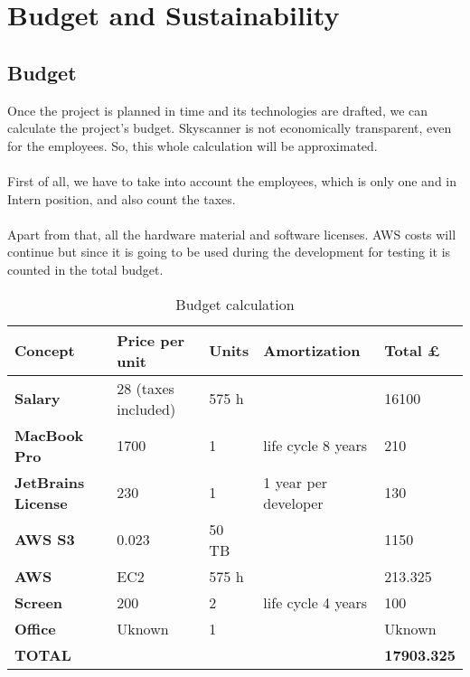 
\chapter{Budget and Sustainability}

\label{chapter10}

\section{Budget}

Once the project is planned in time and its technologies are drafted, we can calculate the project’s budget.
Skyscanner is not economically transparent, even for the employees. So, this whole calculation will be approximated.
\\\\
First of all, we have to take into account the employees, which is only one and in Intern position, and also count the taxes.
\\\\
Apart from that, all the hardware material and software licenses. AWS costs will continue but since it is going to be used during the development for testing it is counted in the total budget.

\begin{table}[H]
\centering
\begin{tabular}{|l|l|l|l|l|}
\hline
\textbf{Concept}           & \textbf{Price per unit} & \textbf{Units} & \textbf{Amortization} & \textbf{Total £}   \\ \hline
\textbf{Salary}            & 28 (taxes included)     & 575 h          &                       & 16100              \\ \hline
\textbf{MacBook Pro}       & 1700                    & 1              & life cycle 8 years    & 210                \\ \hline
\textbf{JetBrains License} & 230                     & 1              & 1 year per developer  & 130                \\ \hline
\textbf{AWS S3}            & 0.023                   & 50 TB          &                       & 1150               \\ \hline
\textbf{AWS}               & EC2                     & 575 h          &                       & 213.325            \\ \hline
\textbf{Screen}            & 200                     & 2              & life cycle 4 years    & 100                \\ \hline
\textbf{Office}            & Uknown                  & 1              &                       & Uknown             \\ \hline
\textbf{TOTAL}             &                         &                &                       & \textbf{17903.325} \\ \hline
\end{tabular}
\caption{Budget calculation}
\label{budget-calculation}
\end{table}

